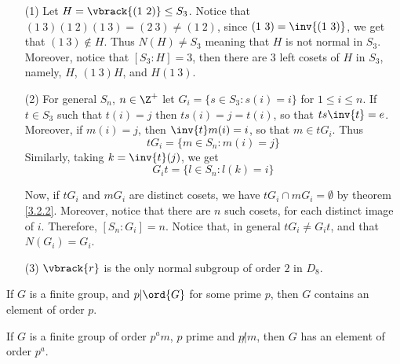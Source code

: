 \begin{example}\label{3.6}
    \begin{enumerate}
        \item[(1)] Let $H=\vbrack{(1 \ 2)} \leq S_3$. Notice that $(1 \ 3)(1 \
            2)(1 \ 3)=(2 \ 3) \neq (1 \ 2)$, since $(1 \ 3)=\inv{(1 \ 3)}$, we
            get that $(1 \ 3) \notin H$. Thus $N(H) \neq S_3$ meaning that $H$
            is not normal in $S_3$. Moreover, notice that $[S_3:H]=3$, then
            there are $3$ left cosets of $H$ in $S_3$, namely, $H$,  $(1 \ 3)H$,
            and $H(1 \ 3)$.

        \item[(2)] For general $S_n$,  $n \in \Z^+$ let  $G_i=\{s \in S_3:
            s(i)=i\}$ for $1 \leq i \leq n$. If $t \in S_3$ such that $t(i)=j$
            then $ts(i)=j=t(i)$, so that $ts\inv{t}=e$. Moreover, if $m(i)=j$,
            then $\inv{t}m(i)=i$, so that $m \in tG_i$. Thus
            \begin{equation*}
                tG_i=\{m \in S_n : m(i)=j\}
            \end{equation*}
            Similarly, taking $k=\inv{t}(j)$, we get
            \begin{equation*}
                G_it=\{l \in S_n : l(k)=i\}
            \end{equation*}

            Now, if $tG_i$ and  $mG_i$ are distinct cosets, we have  $tG_i \cap
            mG_i = \emptyset$ by theorem \ref {3.2.2}. Moreover, notice that
            there are $n$ such cosets, for each distinct image of $i$.
            Therefore, $[S_n:G_i]=n$. Notice that, in general $tG_i \neq G_it$,
            and that  $N(G_i)=G_i$.

        \item[(3)] $\vbrack{r}$ is the only normal subgroup of order $2$ in
            $D_8$.
    \end{enumerate}
\end{example}

\begin{theorem}[Cauchy]\label{3.3.4}
    If $G$ is a finite group, and  $p|\ord{G}$ for some prime $p$, then  $G$
    contains an element of order  $p$.
\end{theorem}

\begin{theorem}[Sylow]\label{3.3.5}
    If $G$ is a finite group of order  $p^am$,  $p$ prime and  $p \not| m$, then
    $G$ has an element of order  $p^a$.
\end{theorem}

